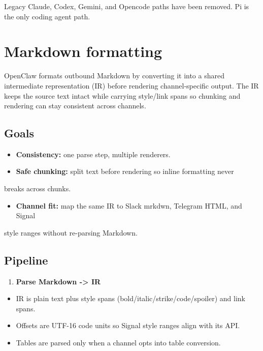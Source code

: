 Legacy Claude, Codex, Gemini, and Opencode paths have been removed. Pi is the only
coding agent path.


\clearpage

\section{Markdown formatting}


OpenClaw formats outbound Markdown by converting it into a shared intermediate
representation (IR) before rendering channel-specific output. The IR keeps the
source text intact while carrying style/link spans so chunking and rendering can
stay consistent across channels.

\subsection{Goals}


\begin{itemize}
  \item \textbf{Consistency:} one parse step, multiple renderers.
  \item \textbf{Safe chunking:} split text before rendering so inline formatting never
\end{itemize}

breaks across chunks.
\begin{itemize}
  \item \textbf{Channel fit:} map the same IR to Slack mrkdwn, Telegram HTML, and Signal
\end{itemize}

style ranges without re-parsing Markdown.

\subsection{Pipeline}


\begin{enumerate}
  \item \textbf{Parse Markdown -> IR}
\end{enumerate}

\begin{itemize}
  \item IR is plain text plus style spans (bold/italic/strike/code/spoiler) and link spans.
  \item Offsets are UTF-16 code units so Signal style ranges align with its API.
  \item Tables are parsed only when a channel opts into table conversion.
\end{itemize}

